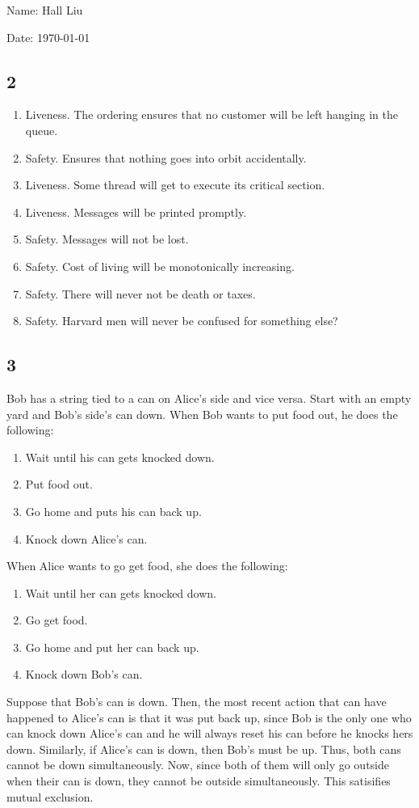 \documentclass{article}
\begin{document}
Name: Hall Liu

Date: \today 
\vspace{1.5cm}

\subsection*{2}
\begin{enumerate}
    \item Liveness. The ordering ensures that no customer will be left hanging in the queue.
    \item Safety. Ensures that nothing goes into orbit accidentally.
    \item Liveness. Some thread will get to execute its critical section.
    \item Liveness. Messages will be printed promptly.
    \item Safety. Messages will not be lost.
    \item Safety. Cost of living will be monotonically increasing.
    \item Safety. There will never not be death or taxes.
    \item Safety. Harvard men will never be confused for something else?
\end{enumerate}
\subsection*{3}
Bob has a string tied to a can on Alice's side and vice versa. Start with an empty yard and Bob's side's can down. When Bob wants to put food out, he does the following:
\begin{enumerate}
    \item Wait until his can gets knocked down.
    \item Put food out.
    \item Go home and puts his can back up.
    \item Knock down Alice's can.
\end{enumerate}
When Alice wants to go get food, she does the following:
\begin{enumerate}
    \item Wait until her can gets knocked down.
    \item Go get food.
    \item Go home and put her can back up.
    \item Knock down Bob's can.
\end{enumerate}
Suppose that Bob's can is down. Then, the most recent action that can have happened to Alice's can is that it was put back up, since Bob is the only one who can knock down Alice's can and he will always reset his can before he knocks hers down. Similarly, if Alice's can is down, then Bob's must be up. Thus, both cans cannot be down simultaneously. Now, since both of them will only go outside when their can is down, they cannot be outside simultaneously. This satisifies mutual exclusion.
\end{document}
